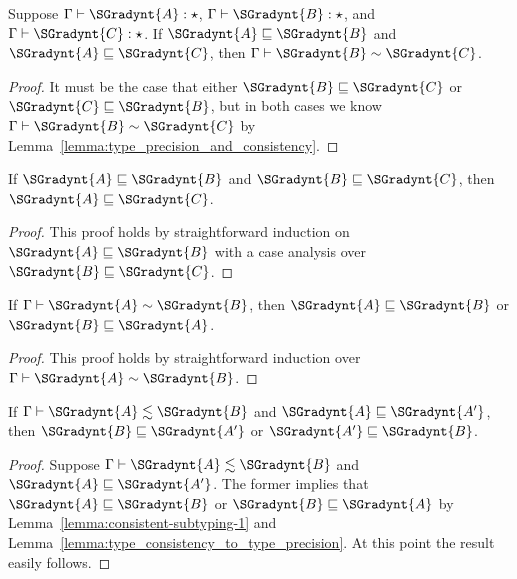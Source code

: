 \begin{lemma}
  \label{lemma:type_precision_triangle_consistenty}
  Suppose $ \Gamma  \vdash  \SGradynt{A}  : \star $, $ \Gamma  \vdash  \SGradynt{B}  : \star $, and $ \Gamma  \vdash  \SGradynt{C}  : \star $.
  If $ \SGradynt{A}  \sqsubseteq  \SGradynt{B} $ and $ \SGradynt{A}  \sqsubseteq  \SGradynt{C} $, then $ \Gamma  \vdash  \SGradynt{B}  \sim  \SGradynt{C} $.
\end{lemma}
\begin{proof}
  It must be the case that either $ \SGradynt{B}  \sqsubseteq  \SGradynt{C} $ or $ \SGradynt{C}  \sqsubseteq  \SGradynt{B} $, but in both cases
  we know $ \Gamma  \vdash  \SGradynt{B}  \sim  \SGradynt{C} $ by Lemma~\ref{lemma:type_precision_and_consistency}.
\end{proof}

\begin{lemma}
  \label{lemma:transitivity_for_type_precision}
  If $ \SGradynt{A}  \sqsubseteq  \SGradynt{B} $ and $ \SGradynt{B}  \sqsubseteq  \SGradynt{C} $, then $ \SGradynt{A}  \sqsubseteq  \SGradynt{C} $.
\end{lemma}
\begin{proof}
  This proof holds by straightforward induction on $ \SGradynt{A}  \sqsubseteq  \SGradynt{B} $ with
  a case analysis over $ \SGradynt{B}  \sqsubseteq  \SGradynt{C} $.
\end{proof}

\begin{lemma}
  \label{lemma:type_consistency_to_type_precision}
  If $ \Gamma  \vdash  \SGradynt{A}  \sim  \SGradynt{B} $, then $ \SGradynt{A}  \sqsubseteq  \SGradynt{B} $ or $ \SGradynt{B}  \sqsubseteq  \SGradynt{A} $.
\end{lemma}
\begin{proof}
  This proof holds by straightforward induction over $ \Gamma  \vdash  \SGradynt{A}  \sim  \SGradynt{B} $.
\end{proof}

\begin{lemma}
  \label{lemma:cons_subtype_to_type_pre}
  If $ \Gamma  \vdash  \SGradynt{A}  \lesssim  \SGradynt{B} $ and $ \SGradynt{A}  \sqsubseteq  \SGradynt{A'} $, then $ \SGradynt{B}  \sqsubseteq  \SGradynt{A'} $ or $ \SGradynt{A'}  \sqsubseteq  \SGradynt{B} $.
\end{lemma}
\begin{proof}
  Suppose $ \Gamma  \vdash  \SGradynt{A}  \lesssim  \SGradynt{B} $ and $ \SGradynt{A}  \sqsubseteq  \SGradynt{A'} $.  The former implies
  that $ \SGradynt{A}  \sqsubseteq  \SGradynt{B} $ or $ \SGradynt{B}  \sqsubseteq  \SGradynt{A} $ by
  Lemma~\ref{lemma:consistent-subtyping-1} and
  Lemma~\ref{lemma:type_consistency_to_type_precision}.  At this
  point the result easily follows.
\end{proof}


